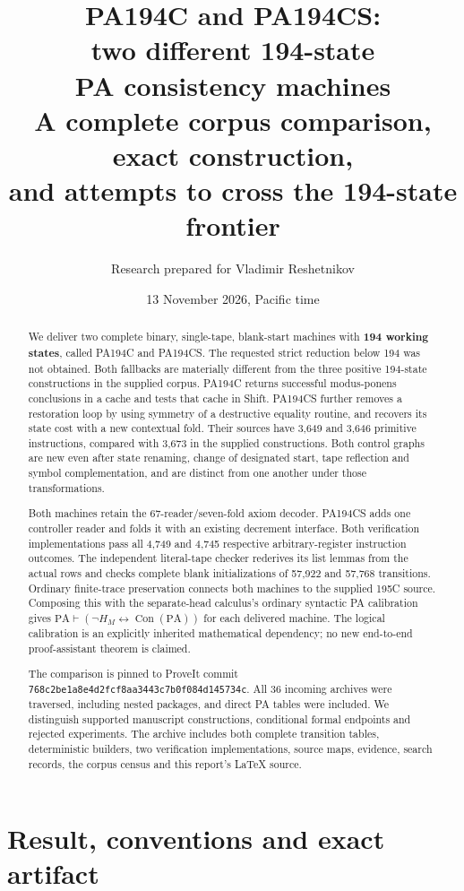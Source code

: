 \documentclass[11pt,letterpaper]{article}
\title{PA194C and PA194CS:\\two different 194-state\\PA consistency machines\\[0.4em]
\large A complete corpus comparison, exact construction,\\and attempts to cross the 194-state frontier}
\author{Research prepared for Vladimir Reshetnikov}
\date{13 November 2026, Pacific time}
\newcommand{\PA}{\mathrm{PA}}
\newcommand{\Con}{\operatorname{Con}}
\begin{document}
\maketitle
\begin{abstract}
We deliver two complete binary, single-tape, blank-start machines with
\textbf{194 working states}, called PA194C and PA194CS. The requested
strict reduction below 194 was not obtained. Both fallbacks are materially
different from the three positive 194-state constructions in the supplied
corpus. PA194C returns successful modus-ponens conclusions in a cache and
tests that cache in Shift. PA194CS further removes a restoration loop by
using symmetry of a destructive equality routine, and recovers its state
cost with a new contextual fold. Their sources have 3,649 and 3,646 primitive
instructions, compared with 3,673 in the supplied constructions. Both
control graphs are new even after state renaming, change of designated
start, tape reflection and symbol complementation, and are distinct from
one another under those transformations.

Both machines retain the 67-reader/seven-fold axiom decoder. PA194CS adds
one controller reader and folds it with an existing decrement interface.
Both verification implementations pass all 4,749 and 4,745 respective
arbitrary-register instruction outcomes. The independent literal-tape
checker rederives its list lemmas from the actual rows and checks complete
blank initializations of 57,922 and 57,768 transitions. Ordinary finite-trace
preservation connects both machines to the supplied 195C source. Composing
this with the separate-head calculus's ordinary syntactic PA calibration
gives $\PA\vdash(\neg H_M\leftrightarrow\Con(\PA))$ for each delivered machine.
The logical calibration is an explicitly inherited mathematical dependency;
no new end-to-end proof-assistant theorem is claimed.

The comparison is pinned to ProveIt commit
\texttt{768c2be1a8e4d2fcf8aa3443c7b0f084d145734c}.
All 36 incoming archives were traversed, including nested packages, and
direct PA tables were included. We distinguish supported manuscript
constructions, conditional formal endpoints and rejected experiments.
The archive includes both complete transition tables, deterministic builders,
two verification implementations, source maps, evidence, search records,
the corpus census and this report's LaTeX source.
\end{abstract}
\clearpage
\tableofcontents
\clearpage

\section{Result, conventions and exact artifact}
\end{document}
